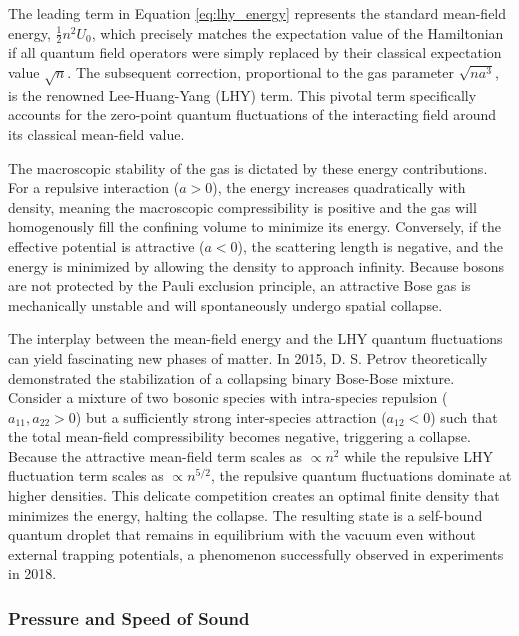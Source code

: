 The leading term in Equation \ref{eq:lhy_energy} represents the standard mean-field energy, \( \frac{1}{2} n^2 U_0 \), which precisely matches the expectation value of the Hamiltonian if all quantum field operators were simply replaced by their classical expectation value \( \sqrt{n} \). The subsequent correction, proportional to the gas parameter \( \sqrt{na^3} \), is the renowned Lee-Huang-Yang (LHY) term. This pivotal term specifically accounts for the zero-point quantum fluctuations of the interacting field around its classical mean-field value.

The macroscopic stability of the gas is dictated by these energy contributions. For a repulsive interaction (\( a > 0 \)), the energy increases quadratically with density, meaning the macroscopic compressibility is positive and the gas will homogenously fill the confining volume to minimize its energy. Conversely, if the effective potential is attractive (\( a < 0 \)), the scattering length is negative, and the energy is minimized by allowing the density to approach infinity. Because bosons are not protected by the Pauli exclusion principle, an attractive Bose gas is mechanically unstable and will spontaneously undergo spatial collapse.

\begin{remark}
    The interplay between the mean-field energy and the LHY quantum fluctuations can yield fascinating new phases of matter. In 2015, D. S. Petrov theoretically demonstrated the stabilization of a collapsing binary Bose-Bose mixture. Consider a mixture of two bosonic species with intra-species repulsion (\( a_{11}, a_{22} > 0 \)) but a sufficiently strong inter-species attraction (\( a_{12} < 0 \)) such that the total mean-field compressibility becomes negative, triggering a collapse. Because the attractive mean-field term scales as \( \propto n^2 \) while the repulsive LHY fluctuation term scales as \( \propto n^{5/2} \), the repulsive quantum fluctuations dominate at higher densities. This delicate competition creates an optimal finite density that minimizes the energy, halting the collapse. The resulting state is a self-bound quantum droplet that remains in equilibrium with the vacuum even without external trapping potentials, a phenomenon successfully observed in experiments in 2018.
\end{remark}

\subsubsection{Pressure and Speed of Sound}

